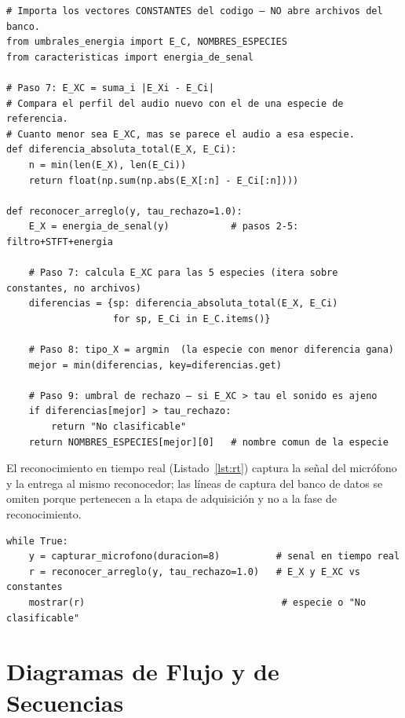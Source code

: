 \documentclass[conference]{IEEEtran}
\begin{document}
\begin{lstlisting}[caption={Diferencia total absoluta, $\arg\min$ y umbral de rechazo (\texttt{reconocer.py}).},label=lst:dist]
# Importa los vectores CONSTANTES del codigo — NO abre archivos del banco.
from umbrales_energia import E_C, NOMBRES_ESPECIES
from caracteristicas import energia_de_senal

# Paso 7: E_XC = suma_i |E_Xi - E_Ci|
# Compara el perfil del audio nuevo con el de una especie de referencia.
# Cuanto menor sea E_XC, mas se parece el audio a esa especie.
def diferencia_absoluta_total(E_X, E_Ci):
    n = min(len(E_X), len(E_Ci))
    return float(np.sum(np.abs(E_X[:n] - E_Ci[:n])))

def reconocer_arreglo(y, tau_rechazo=1.0):
    E_X = energia_de_senal(y)           # pasos 2-5: filtro+STFT+energia

    # Paso 7: calcula E_XC para las 5 especies (itera sobre constantes, no archivos)
    diferencias = {sp: diferencia_absoluta_total(E_X, E_Ci)
                   for sp, E_Ci in E_C.items()}

    # Paso 8: tipo_X = argmin  (la especie con menor diferencia gana)
    mejor = min(diferencias, key=diferencias.get)

    # Paso 9: umbral de rechazo — si E_XC > tau el sonido es ajeno
    if diferencias[mejor] > tau_rechazo:
        return "No clasificable"
    return NOMBRES_ESPECIES[mejor][0]   # nombre comun de la especie
\end{lstlisting}

El reconocimiento en tiempo real (Listado~\ref{lst:rt}) captura la señal del
micrófono y la entrega al mismo reconocedor; las líneas de captura del banco de
datos se omiten porque pertenecen a la etapa de adquisición y no a la fase de
reconocimiento.

\begin{lstlisting}[caption={Bucle de reconocimiento en tiempo real (\texttt{reconocimiento\_tiempo\_real.py}).},label=lst:rt]
while True:
    y = capturar_microfono(duracion=8)          # senal en tiempo real
    r = reconocer_arreglo(y, tau_rechazo=1.0)   # E_X y E_XC vs constantes
    mostrar(r)                                   # especie o "No clasificable"
\end{lstlisting}

\section{Diagramas de Flujo y de Secuencias}\label{sec:flujoseq}
\end{document}
